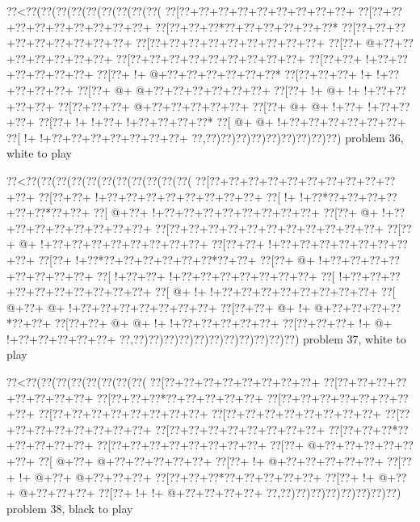 \vbox{\vbox{\goo
\0??<\0??(\0??(\0??(\0??(\0??(\0??(\0??(\0??(\0??(
\0??[\0??+\0??+\0??+\0??+\0??+\0??+\0??+\0??+\0??+
\0??[\0??+\0??+\0??+\0??+\0??+\0??+\0??+\0??+\0??+
\0??[\0??+\0??+\0??*\0??+\0??+\0??+\0??+\0??+\0??*
\0??[\0??+\0??+\0??+\0??+\0??+\0??+\0??+\0??+\0??+
\0??[\0??+\0??+\0??+\0??+\0??+\0??+\0??+\0??+\0??+
\0??[\0??+\- @+\0??+\0??+\0??+\0??+\0??+\0??+\0??+
\0??[\0??+\0??+\0??+\0??+\0??+\0??+\0??+\0??+\0??+
\0??[\0??+\0??+\- !+\0??+\0??+\0??+\0??+\0??+\0??+
\0??[\0??+\- !+\- @+\0??+\0??+\0??+\0??+\0??+\0??*
\0??[\0??+\0??+\0??+\- !+\- !+\0??+\0??+\0??+\0??+
\0??[\0??+\- @+\- @+\0??+\0??+\0??+\0??+\0??+\0??+
\0??[\0??+\- !+\- @+\- !+\- !+\0??+\0??+\0??+\0??+
\0??[\0??+\0??+\0??+\- @+\0??+\0??+\0??+\0??+\0??+
\0??[\0??+\- @+\- @+\- !+\0??+\- !+\0??+\0??+\0??+
\0??[\0??+\- !+\- !+\0??+\- !+\0??+\0??+\0??+\0??*
\0??[\- @+\- @+\- !+\0??+\0??+\0??+\0??+\0??+\0??+
\0??[\- !+\- !+\0??+\0??+\0??+\0??+\0??+\0??+\0??+
\0??,\0??)\0??)\0??)\0??)\0??)\0??)\0??)\0??)\0??)
}
\hfil problem 36, white to play\hfil\break
}

\vbox{\vbox{\goo
\0??<\0??(\0??(\0??(\0??(\0??(\0??(\0??(\0??(\0??(\0??(\0??(
\0??[\0??+\0??+\0??+\0??+\0??+\0??+\0??+\0??+\0??+\0??+\0??+
\0??[\0??+\0??+\- !+\0??+\0??+\0??+\0??+\0??+\0??+\0??+\0??+
\0??[\- !+\- !+\0??*\0??+\0??+\0??+\0??+\0??+\0??*\0??+\0??+
\0??[\- @+\0??+\- !+\0??+\0??+\0??+\0??+\0??+\0??+\0??+\0??+
\0??[\0??+\- @+\- !+\0??+\0??+\0??+\0??+\0??+\0??+\0??+\0??+
\0??[\0??+\0??+\0??+\0??+\0??+\0??+\0??+\0??+\0??+\0??+\0??+
\0??[\0??+\- @+\- !+\0??+\0??+\0??+\0??+\0??+\0??+\0??+\0??+
\0??[\0??+\0??+\- !+\0??+\0??+\0??+\0??+\0??+\0??+\0??+\0??+
\0??[\0??+\- !+\0??*\0??+\0??+\0??+\0??+\0??+\0??*\0??+\0??+
\0??[\0??+\- @+\- !+\0??+\0??+\0??+\0??+\0??+\0??+\0??+\0??+
\0??[\- !+\0??+\0??+\- !+\0??+\0??+\0??+\0??+\0??+\0??+\0??+
\0??[\- !+\0??+\0??+\0??+\0??+\0??+\0??+\0??+\0??+\0??+\0??+
\0??[\- @+\- !+\- !+\0??+\0??+\0??+\0??+\0??+\0??+\0??+\0??+
\0??[\- @+\0??+\- @+\- !+\0??+\0??+\0??+\0??+\0??+\0??+\0??+
\0??[\0??+\0??+\- @+\- !+\- @+\0??+\0??+\0??+\0??*\0??+\0??+
\0??[\0??+\0??+\- @+\- @+\- !+\- !+\0??+\0??+\0??+\0??+\0??+
\0??[\0??+\0??+\0??+\- !+\- @+\- !+\0??+\0??+\0??+\0??+\0??+
\0??,\0??)\0??)\0??)\0??)\0??)\0??)\0??)\0??)\0??)\0??)\0??)
}
\hfil problem 37, white to play\hfil\break
}

\vbox{\vbox{\goo
\0??<\0??(\0??(\0??(\0??(\0??(\0??(\0??(\0??(
\0??[\0??+\0??+\0??+\0??+\0??+\0??+\0??+\0??+
\0??[\0??+\0??+\0??+\0??+\0??+\0??+\0??+\0??+
\0??[\0??+\0??+\0??*\0??+\0??+\0??+\0??+\0??+
\0??[\0??+\0??+\0??+\0??+\0??+\0??+\0??+\0??+
\0??[\0??+\0??+\0??+\0??+\0??+\0??+\0??+\0??+
\0??[\0??+\0??+\0??+\0??+\0??+\0??+\0??+\0??+
\0??[\0??+\0??+\0??+\0??+\0??+\0??+\0??+\0??+
\0??[\0??+\0??+\0??+\0??+\0??+\0??+\0??+\0??+
\0??[\0??+\0??+\0??*\0??+\0??+\0??+\0??+\0??+
\0??[\0??+\0??+\0??+\0??+\0??+\0??+\0??+\0??+
\0??[\0??+\- @+\0??+\0??+\0??+\0??+\0??+\0??+
\0??[\- @+\0??+\- @+\0??+\0??+\0??+\0??+\0??+
\0??[\0??+\- !+\- @+\0??+\0??+\0??+\0??+\0??+
\0??[\0??+\- !+\- @+\0??+\- @+\0??+\0??+\0??+
\0??[\0??+\0??+\0??*\0??+\0??+\0??+\0??+\0??+
\0??[\0??+\- !+\- @+\0??+\- @+\0??+\0??+\0??+
\0??[\0??+\- !+\- !+\- @+\0??+\0??+\0??+\0??+
\0??,\0??)\0??)\0??)\0??)\0??)\0??)\0??)\0??)
}
\hfil problem 38, black to play\hfil\break
}

